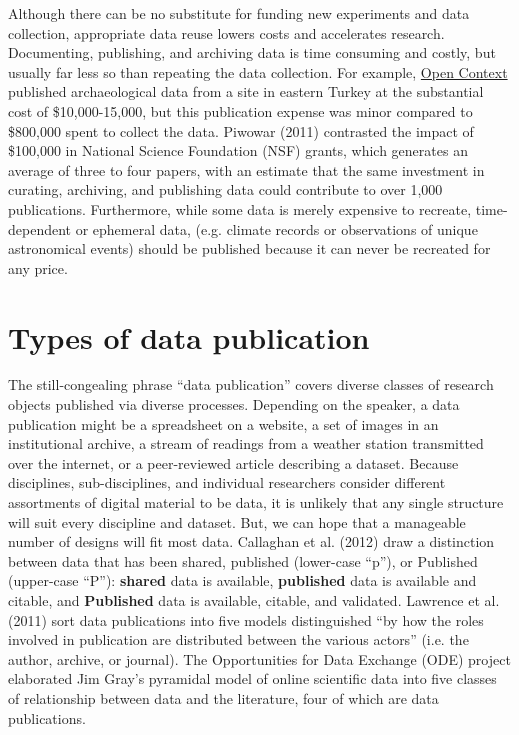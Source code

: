 \documentclass[10pt,a4paper,twocolumn]{article}
\begin{document}
Although there can be no substitute for funding new experiments and data collection, appropriate data reuse lowers costs and accelerates research.
Documenting, publishing, and archiving data is time consuming and costly, but usually far less so than repeating the data collection.
For example, \href{http://opencontext.org/}{Open Context} published archaeological data from a site in eastern Turkey at the substantial cost of \$10,000-15,000, but this publication expense was minor compared to \$800,000 spent to collect the data\cite{kansa_we_2013}.
Piwowar (2011) contrasted the impact of \$100,000 in National Science Foundation (NSF) grants, which generates an average of three to four papers, with an estimate that the same investment in curating, archiving, and publishing data could contribute to over 1,000 publications\cite{piwowar_data_2011}.
Furthermore, while some data is merely expensive to recreate, time-dependent or ephemeral data, (e.g. climate records or observations of unique astronomical events) should be published because it can never be recreated for any price\cite{gray_online_2002}.


\section*{Types of data publication}\label{types-of-data-publication}

The still-congealing phrase ``data publication'' covers diverse classes of research objects published via diverse processes.
Depending on the speaker, a data publication might be a spreadsheet on a website, a set of images in an institutional archive, a stream of readings from a weather station transmitted over the internet, or a peer-reviewed article describing a dataset.
Because disciplines, sub-disciplines, and individual researchers consider different assortments of digital material to be data, it is unlikely that any single structure will suit every discipline and dataset.
But, we can hope that a manageable number of designs will fit most data.
Callaghan et al. (2012) draw a distinction between data that has been shared, published (lower-case “p”), or Published (upper-case “P”): \textbf{shared} data is available, \textbf{published} data is available and citable, and \textbf{Published} data is available, citable, and validated\cite{sarah_callaghan_making_2012}.
Lawrence et al. (2011) sort data publications into five models distinguished ``by how the roles involved in publication are distributed between the various actors'' (i.e. the author, archive, or journal)\cite{lawrence_data_2011}.
The Opportunities for Data Exchange (ODE) project elaborated Jim Gray's pyramidal model of online scientific data\cite{gray_jim_2009} into five classes of relationship between data and the literature, four of which are data publications\cite{reilly_report_2011}.
\end{document}
